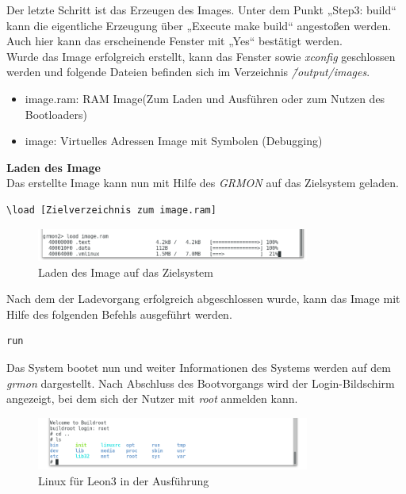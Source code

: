 Der letzte Schritt ist das Erzeugen des Images. Unter dem Punkt „Step3: build“ kann die eigentliche Erzeugung über „Execute make build“ angestoßen werden. Auch hier kann das erscheinende Fenster mit „Yes“ bestätigt werden.\\
Wurde das Image erfolgreich erstellt, kann das Fenster sowie \emph{xconfig} geschlossen werden und folgende Dateien befinden sich im Verzeichnis \emph{\~/output/images}.\\
\begin{itemize}
\item image.ram: RAM Image(Zum Laden und Ausführen oder zum Nutzen des Bootloaders)
\item image: Virtuelles Adressen Image mit Symbolen (Debugging)
\end{itemize}

\newpage
\textbf{Laden des Image}\\

Das erstellte Image kann nun mit Hilfe des \emph{GRMON} auf das Zielsystem geladen.\\

\begin{lstlisting}[caption={Laden des Image},label={code:linuximage}]
\load [Zielverzeichnis zum image.ram]
\end{lstlisting}

\begin{figure}[H]
\centering
\includegraphics[width=0.8\textwidth]{Hauptteil/loadimage.png}
\caption{Laden des Image auf das Zielsystem}
\label{fig:toolchainconf}
\end{figure}

Nach dem der Ladevorgang erfolgreich abgeschlossen wurde, kann das Image mit Hilfe des folgenden Befehls ausgeführt werden.\\

\begin{lstlisting}[caption={Ausführen des Image},label={code:linuxrun}]
run
\end{lstlisting}


Das System bootet nun und weiter Informationen des Systems werden auf dem \emph{grmon} dargestellt. Nach Abschluss des Bootvorgangs wird der Login-Bildschirm angezeigt, bei
dem sich der Nutzer mit \emph{root} anmelden kann.\\

\begin{figure}[H]
\centering
\includegraphics[width=0.8\textwidth]{Hauptteil/leon3linux.png}
\caption{Linux für Leon3 in der Ausführung}
\label{fig:leon3linux}
\end{figure}

